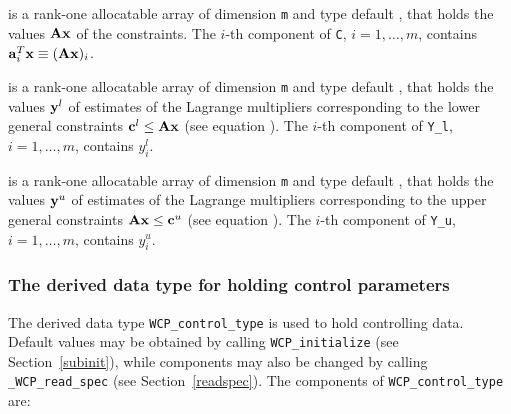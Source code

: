 \documentclass{galahad}
\newcommand{\packagename}{WCP}
\newcommand{\fullpackagename}{\libraryname\_\-\packagename}
\begin{document}
\begin{description}
 is a rank-one allocatable array of dimension {\tt m} and type default 
\realdp, that holds
the values ${\mathbf{A}} {\mathbf{x}}$ of the constraints.
The $i$-th component of {\tt C}, $i = 1,  \ldots ,  m$, contains 
${\mathbf{a}}_{i}^{T}{\mathbf{x}} \equiv ({\mathbf{A}} {\mathbf{x}})_{i}$.  

 is a rank-one allocatable array of dimension {\tt m} and type default 
\realdp, that holds
the values ${\mathbf{y}}^{l}$ of estimates  of the Lagrange multipliers
corresponding to the lower general constraints ${\mathbf{c}}^{l} \leq {\mathbf{A}} {\mathbf{x}}$
(see equation ).
The $i$-th component of {\tt Y\_l}, $i = 1,  \ldots ,  m$, 
contains $y_{i}^{l}$.  

 is a rank-one allocatable array of dimension {\tt m} and type default 
\realdp, that holds
the values ${\mathbf{y}}^{u}$ of estimates  of the Lagrange multipliers
corresponding to the upper general constraints ${\mathbf{A}} {\mathbf{x}} \leq {\mathbf{c}}^{u}$
(see equation ).
The $i$-th component of {\tt Y\_u}, $i = 1,  \ldots ,  m$, 
contains $y_{i}^{u}$.  

\end{description}


\subsubsection{The derived data type for holding control 
 parameters}\label{typecontrol}
The derived data type 
{\tt \packagename\_control\_type} 
is used to hold controlling data. Default values may be obtained by calling 
{\tt \packagename\_initialize}
(see Section~\ref{subinit}),
while components may also be changed by calling 
{\tt \fullpackagename\_read\-\_spec}
(see Section~\ref{readspec}). 
The components of 
{\tt \packagename\_control\_type} 
are:
\end{document}

